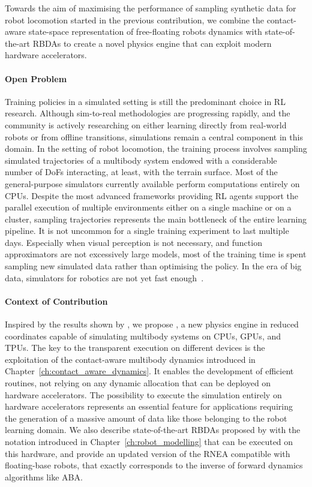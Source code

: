 Towards the aim of maximising the performance of sampling synthetic data for robot locomotion started in the previous contribution, we combine the contact-aware state-space representation of free-floating robots dynamics with state-of-the-art \acp{RBDA} to create a novel physics engine that can exploit modern hardware accelerators.

\paragraph{Open Problem}

Training policies in a simulated setting is still the predominant choice in \ac{RL} research.
Although sim-to-real methodologies are progressing rapidly, and the community is actively researching on either learning directly from real-world robots or from offline transitions, simulations remain a central component in this domain.
In the setting of robot locomotion, the training process involves sampling simulated trajectories of a multibody system endowed with a considerable number of \acp{DoF} interacting, at least, with the terrain surface.
Most of the general-purpose simulators currently available perform computations entirely on \acp{CPU}.
Despite the most advanced frameworks providing \ac{RL} agents support the parallel execution of multiple environments either on a single machine or on a cluster, sampling trajectories represents the main bottleneck of the entire learning pipeline.
It is not uncommon for a single training experiment to last multiple days.
Especially when visual perception is not necessary, and function approximators are not excessively large models, most of the training time is spent sampling new simulated data rather than optimising the policy.
In the era of big data, simulators for robotics are not yet fast enough~\parencite{choi_use_2021}.

\paragraph{Context of Contribution}

Inspired by the results shown by \textcite{freeman_brax_2021}, we propose \jaxsim, a new physics engine in reduced coordinates capable of simulating multibody systems on \acp{CPU}, \acp{GPU}, and \acp{TPU}.
The key to the transparent execution on different devices is the exploitation of the contact-aware multibody dynamics introduced in Chapter~\ref{ch:contact_aware_dynamics}.
It enables the development of efficient routines, not relying on any dynamic allocation that can be deployed on hardware accelerators.
The possibility to execute the simulation entirely on hardware accelerators represents an essential feature for applications requiring the generation of a massive amount of data like those belonging to the robot learning domain.
We also describe state-of-the-art \acp{RBDA} proposed by \textcite{featherstone_rigid_2008} with the notation introduced in Chapter~\ref{ch:robot_modelling} that can be executed on this hardware, and provide an updated version of the \ac{RNEA} compatible with floating-base robots, that exactly corresponds to the inverse of forward dynamics algorithms like \ac{ABA}.

